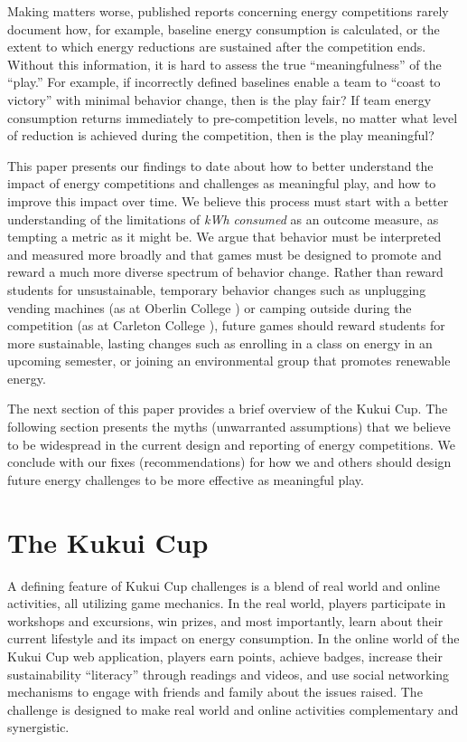 \documentclass[jou]{apa} %
\begin{document}
Making matters worse, published reports concerning energy competitions rarely document
how, for example, baseline energy consumption is calculated, or the extent to which energy
reductions are sustained after the competition ends.  Without this information, it is
hard to assess the true ``meaningfulness'' of the ``play.''  For example, if incorrectly
defined baselines enable a team to ``coast to victory'' with minimal behavior change,
then is the play fair? If team energy consumption returns immediately to pre-competition
levels, no matter what level of reduction is achieved during the competition, then is the
play meaningful?

This paper presents our findings to date about how to better understand the impact of
energy competitions and challenges as meaningful play, and how to improve this impact over
time.  We believe this process must start with a better understanding of the limitations
of {\em kWh consumed} as an outcome measure, as tempting a metric as it might be. We
argue that behavior must be interpreted and measured more broadly and that games must
be designed to promote and reward a much more diverse spectrum of behavior change.  Rather
than reward students for unsustainable, temporary behavior changes such as unplugging
vending machines (as at Oberlin College \cite{Petersen07a}) or camping outside during the
competition (as at Carleton College \cite{Hodge2010}), future games should reward students
for more sustainable, lasting changes such as enrolling in a class on energy in an upcoming
semester, or joining an environmental group that promotes renewable energy.

The next section of this paper provides a brief overview of the Kukui Cup.  The following
section presents the myths (unwarranted assumptions) that we believe to be widespread in the
current design and reporting of energy competitions. We conclude with our fixes (recommendations)
for how we and others should design future energy challenges to be more effective as
meaningful play.

\section{The Kukui Cup}

A defining feature of Kukui Cup challenges is a blend of real world and online
activities, all utilizing game mechanics.  In the real world, players participate in
workshops and excursions, win prizes, and most importantly, learn about their current
lifestyle and its impact on energy consumption. In the online world of the Kukui Cup web
application, players earn points, achieve badges, increase their sustainability ``literacy''
through readings and videos, and use social networking mechanisms to engage with friends
and family about the issues raised. The challenge is designed to make real world and
online activities complementary and synergistic.
\end{document}
